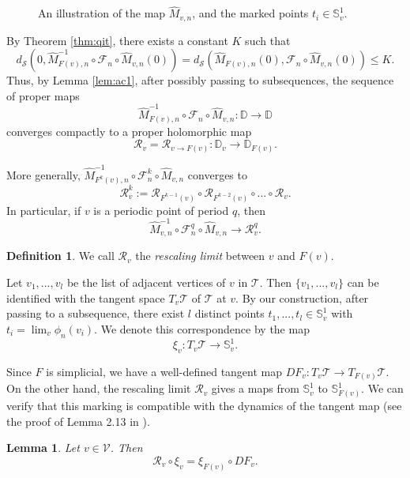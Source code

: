 \documentclass[11pt, reqno]{amsart}
\newcommand{\incfig}[1]{%
    \def\svgwidth{\columnwidth}
    {#1.pdf_tex}
}
\numberwithin{equation}{section}
\theoremstyle{plain}
\theoremstyle{theorem}
\newtheorem{lem}[theorem]{Lemma}
\theoremstyle{definition}
\newtheorem{defn}[theorem]{Definition}
\newcommand{\D}{\mathbb{D}}
\newcommand{\bp}{\mathcal{F}}
\newcommand{\rl}{\mathcal{R}}
\numberwithin{figure}{section}
\begin{document}
\begin{figure}[ht]
  \centering
  \resizebox{0.9\linewidth}{!}{
  \incfig{RL}
  }
  \caption{An illustration of the map $\hat M_{v,n}$, and the marked points $t_i \in \mathbb{S}^1_v$.}
  \label{fig:RL}
\end{figure}

By Theorem \ref{thm:qit}, there exists a constant $K$ such that
$$
d_{\mathcal{S}}(0,\hat M_{F(v),n}^{-1}\circ \bp_n \circ \hat M_{v,n}(0)) = d_{\mathcal{S}}(\hat M_{F(v),n}(0),\bp_n\circ \hat M_{v,n}(0)) \leq K.
$$
Thus, by Lemma \ref{lem:ac1}, after possibly passing to subsequences, the sequence of proper maps
$$
\hat M_{F(v),n}^{-1}\circ \bp_n \circ \hat M_{v,n}: \D \longrightarrow \D
$$
converges compactly to a proper holomorphic map
$$
\rl_v = \rl_{v\to F(v)}: \D_v \longrightarrow \D_{F(v)}.
$$

More generally,
$\hat M_{F^k(v),n}^{-1}\circ \bp^k_n \circ \hat M_{v,n}$
converges to 
$$
\rl^k_{v}:=\rl_{F^{k-1}(v)}\circ \rl_{F^{k-2}(v)}\circ...\circ \rl_{v}.
$$
In particular, if $v$ is a periodic point of period $q$, then
$$
\hat M_{v,n}^{-1}\circ \bp^q_n \circ \hat M_{v,n} \to \rl^q_v.
$$

\begin{defn}\label{defn:rlm}
We call $\rl_v$ the {\em rescaling limit} between $v$ and $F(v)$.
\end{defn}


Let $v_1,..., v_l$ be the list of adjacent vertices of $v$ in $\mathcal{T}$. 
Then $\{v_1,..., v_l\}$ can be identified with the tangent space $T_v\mathcal{T}$ of $\mathcal{T}$ at $v$.
By our construction, after passing to a subsequence, there exist $l$ distinct points $t_1,..., t_l \in \mathbb{S}^1_v$ with
$t_i = \lim_v \phi_n(v_i)$.
We denote this correspondence by the map
$$
\xi_v: T_v\mathcal{T} \longrightarrow \mathbb{S}^1_v.
$$

Since $F$ is simplicial, we have a well-defined tangent map $DF_v:T_v\mathcal{T} \longrightarrow T_{F(v)}\mathcal{T}$. 
On the other hand, the rescaling limit $\rl_{v}$ gives a maps from $\mathbb{S}^1_v$ to $\mathbb{S}^1_{F(v)}$.
We can verify that this marking is compatible with the dynamics of the tangent map (see the proof of Lemma 2.13 in \cite{Luo21}).
\begin{lem}\label{lem:ct}
Let $v\in \mathcal{V}$. Then
$$
\rl_{v} \circ \xi_v = \xi_{F(v)} \circ DF_v.
$$
\end{lem}
\end{document}
